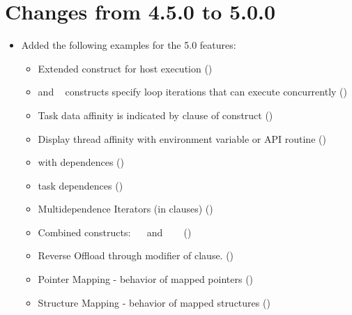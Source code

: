 \section{Changes from 4.5.0 to 5.0.0}
\label{sec:history_45_to_50}

\begin{itemize}
\item Added the following examples for the 5.0 features:

\begin{itemize}
\item Extended  construct for host execution     ()
\item {} and ~ constructs specify loop iterations that can execute concurrently 
                                                             ()
\item Task data affinity is indicated by  clause of  construct
                                                             ()
\item Display thread affinity with  environment variable or  API routine
                                                             ()
\item {} with dependences                       ()
\item {} task dependences                  ()
\item Multidependence Iterators (in  clauses)   ()
\item Combined constructs: ~~ and ~~~
                                                                                  ()
\item Reverse Offload through  modifier of  clause.    ()
\item Pointer Mapping  - behavior of mapped pointers                              ()   %
\item Structure Mapping  - behavior of mapped structures                          () %

\end{itemize}
\end{itemize}
